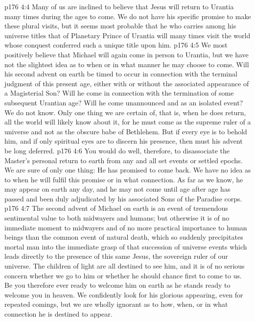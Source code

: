 \vs p176 4:4 Many of us are inclined to believe that Jesus will return to Urantia many times during the ages to come. We do not have his specific promise to make these plural visits, but it seems most probable that he who carries among his universe titles that of Planetary Prince of Urantia will many times visit the world whose conquest conferred such a unique title upon him.
\vs p176 4:5 We most positively believe that Michael will again come in person to Urantia, but we have not the slightest idea as to when or in what manner he may choose to come. Will his second advent on earth be timed to occur in connection with the terminal judgment of this present age, either with or without the associated appearance of a Magisterial Son? Will he come in connection with the termination of some subsequent Urantian age? Will he come unannounced and as an isolated event? We do not know. Only one thing we are certain of, that is, when he does return, all the world will likely know about it, for he must come as the supreme ruler of a universe and not as the obscure babe of Bethlehem. But if every eye is to behold him, and if only spiritual eyes are to discern his presence, then must his advent be long deferred.
\vs p176 4:6 You would do well, therefore, to disassociate the Master’s personal return to earth from any and all set events or settled epochs. We are sure of only one thing: He has promised to come back. We have no idea as to when he will fulfil this promise or in what connection. As far as we know, he may appear on earth any day, and he may not come until age after age has passed and been duly adjudicated by his associated Sons of the Paradise corps.
\vs p176 4:7 The second advent of Michael on earth is an event of tremendous sentimental value to both midwayers and humans; but otherwise it is of no immediate moment to midwayers and of no more practical importance to human beings than the common event of natural death, which so suddenly precipitates mortal man into the immediate grasp of that succession of universe events which leads directly to the presence of this same Jesus, the sovereign ruler of our universe. The children of light are all destined to see him, and it is of no serious concern whether we go to him or whether he should chance first to come to us. Be you therefore ever ready to welcome him on earth as he stands ready to welcome you in heaven. We confidently look for his glorious appearing, even for repeated comings, but we are wholly ignorant as to how, when, or in what connection he is destined to appear.
